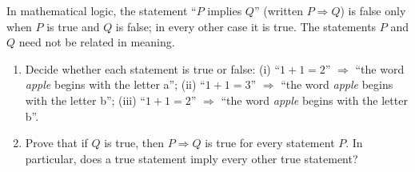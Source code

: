 In mathematical logic, the statement ``$P$ implies $Q$'' (written $P\Rightarrow Q$) is false only when $P$ is true and $Q$ is false; in every other case it is true. The statements $P$ and $Q$ need not be related in meaning.
\begin{enumerate}
\item[(a)] Decide whether each statement is true or false:
(i) ``$1+1=2$'' $\Rightarrow$ ``the word \emph{apple} begins with the letter a'';
(ii) ``$1+1=3$'' $\Rightarrow$ ``the word \emph{apple} begins with the letter b'';
(iii) ``$1+1=2$'' $\Rightarrow$ ``the word \emph{apple} begins with the letter b''.
\item[(b)] Prove that if $Q$ is true, then $P\Rightarrow Q$ is true for every statement $P$. In particular, does a true statement imply every other true statement?
\end{enumerate}
